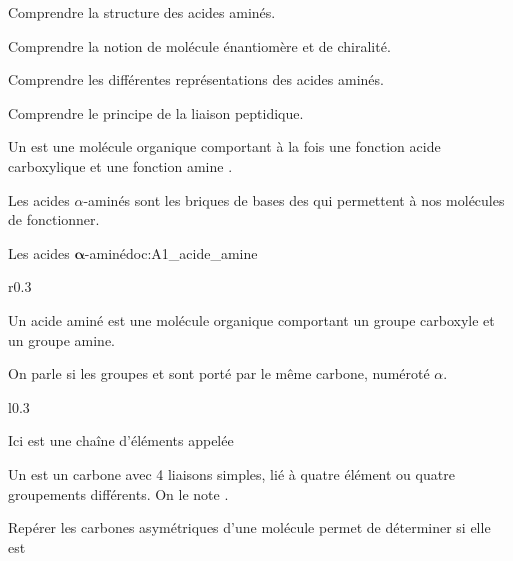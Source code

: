 \teteTermStssBiom


\begin{objectifs}
  \item Comprendre la structure des acides aminés.
  \item Comprendre la notion de molécule énantiomère et de chiralité.
  \item Comprendre les différentes représentations des acides aminés.
  \item Comprendre le principe de la liaison peptidique.
\end{objectifs}

\begin{contexte}
  Un  est une molécule organique comportant à la fois une fonction acide carboxylique  et une fonction amine .

  Les acides $\alpha$-aminés sont les briques de bases des  qui permettent à nos molécules de fonctionner. 
  
\end{contexte}


\begin{doc}{Les acides $\mathbf{\alpha}$-aminé}{doc:A1_acide_amine}
  \begin{wrapfigure}[3]{r}{0.3\linewidth}
    \centering
    \vspace*{-24pt}
  \end{wrapfigure}
  Un acide aminé est une molécule organique comportant un groupe carboxyle et un groupe amine.

  \begin{encart}
    On parle  si les groupes  et  sont porté par le même carbone, numéroté $\alpha$.
  \end{encart}
  
  \begin{wrapfigure}{l}{0.3\linewidth}
    \centering
    \vspace*{-10pt}
  \end{wrapfigure}

  Ici  est une chaîne d'éléments appelée 
  
  \begin{encart}  
    Un  est un carbone avec 4 liaisons simples, lié à quatre élément ou quatre groupements différents.
    On le note .
  \end{encart}

  Repérer les carbones asymétriques d'une molécule permet de déterminer si elle est 
\end{doc}


